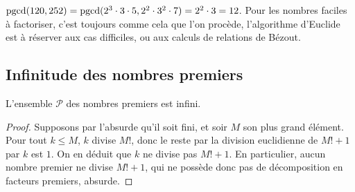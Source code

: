 \begin{exemple}
$\operatorname{pgcd}(120,252)=\operatorname{pgcd}(2^3\cdot 3\cdot 5,2^2\cdot 3^2\cdot 7) =2^2\cdot 3=12$.
Pour les nombres faciles à factoriser, c'est toujours comme cela que l'on procède, l'algorithme d'Euclide est à réserver aux cas difficiles, ou aux calculs de relations de Bézout.
\end{exemple}


\subsection{Infinitude des nombres premiers}

\begin{proposition}
L'ensemble $\mathcal P$ des nombres premiers est infini.
\end{proposition}
\begin{proof}
Supposons par l'absurde qu'il soit fini, et soir $M$ son plus grand élément. Pour tout $k\leq M$, $k$ divise $M!$, donc le reste par la division euclidienne de $M!+1$ par $k$ est $1$. On en déduit que $k$ ne divise pas $M!+1$. En particulier, aucun nombre premier ne divise $M!+1$, qui ne possède donc pas de décomposition en facteurs premiers, absurde.
\end{proof}


